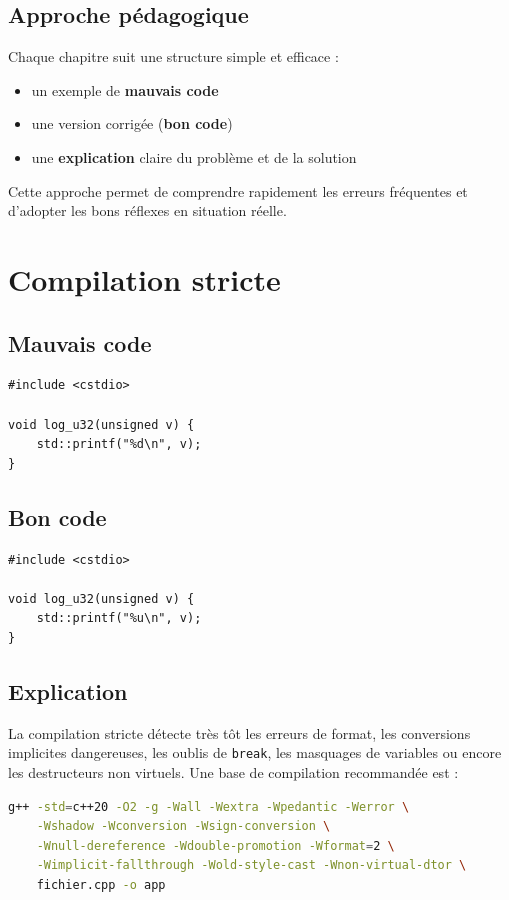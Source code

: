 \documentclass[a4paper,11pt]{report}
\begin{document}
\section{Approche pédagogique}

Chaque chapitre suit une structure simple et efficace :
\begin{itemize}
  \item un exemple de \textbf{mauvais code}
  \item une version corrigée (\textbf{bon code})
  \item une \textbf{explication} claire du problème et de la solution
\end{itemize}

Cette approche permet de comprendre rapidement les erreurs fréquentes et d'adopter les bons réflexes en situation réelle.

\chapter{Compilation stricte}

\section{Mauvais code}
\begin{lstlisting}
#include <cstdio>

void log_u32(unsigned v) {
    std::printf("%d\n", v);
}
\end{lstlisting}

\section{Bon code}
\begin{lstlisting}
#include <cstdio>

void log_u32(unsigned v) {
    std::printf("%u\n", v);
}
\end{lstlisting}

\section{Explication}
La compilation stricte détecte très tôt les erreurs de format, les conversions implicites dangereuses, les oublis de \texttt{break}, les masquages de variables ou encore les destructeurs non virtuels.
Une base de compilation recommandée est :

\begin{lstlisting}[language=bash]
g++ -std=c++20 -O2 -g -Wall -Wextra -Wpedantic -Werror \
    -Wshadow -Wconversion -Wsign-conversion \
    -Wnull-dereference -Wdouble-promotion -Wformat=2 \
    -Wimplicit-fallthrough -Wold-style-cast -Wnon-virtual-dtor \
    fichier.cpp -o app
\end{lstlisting}
\end{document}
